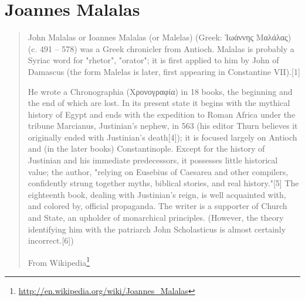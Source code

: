 \documentclass[12pt,letterpaper,twoside,final]{memoir}
\begin{document}
\section{Joannes Malalas}
\blockquote[From Wikipedia\footnote{\url{http://en.wikipedia.org/wiki/Joannes_Malalas}}]{John Malalas or Ioannes Malalas (or Malelas) (Greek: Ἰωάννης Μαλάλας) (c. 491 – 578) was a Greek chronicler from Antioch. Malalas is probably a Syriac word for "rhetor", "orator"; it is first applied to him by John of Damascus (the form Malelas is later, first appearing in Constantine VII).[1]



He wrote a Chronographia (Χρονογραφία) in 18 books, the beginning and the end of which are lost. In its present state it begins with the mythical history of Egypt and ends with the expedition to Roman Africa under the tribune Marcianus, Justinian's nephew, in 563 (his editor Thurn believes it originally ended with Justinian's death[4]); it is focused largely on Antioch and (in the later books) Constantinople. Except for the history of Justinian and his immediate predecessors, it possesses little historical value; the author, "relying on Eusebius of Caesarea and other compilers, confidently strung together myths, biblical stories, and real history."[5] The eighteenth book, dealing with Justinian's reign, is well acquainted with, and colored by, official propaganda. The writer is a supporter of Church and State, an upholder of monarchical principles. (However, the theory identifying him with the patriarch John Scholasticus is almost certainly incorrect.[6])}
\end{document}
